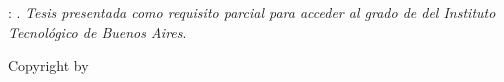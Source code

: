 \vspace*{0.8\textheight}
\noindent \@author: \@title. \textit{Tesis presentada como requisito parcial para acceder al grado de \textbf{\@degree} del Instituto Tecnológico de Buenos Aires}.
\par
\vspace{1\baselineskip}
\noindent Copyright \textcopyright\space\@copyrightYear\space by \@author
